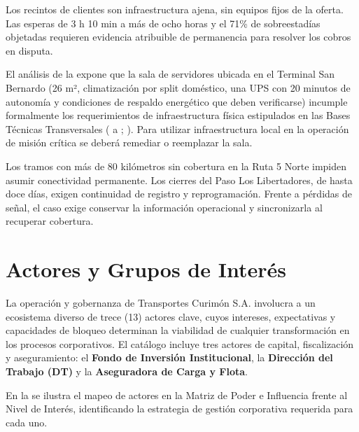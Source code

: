 Los recintos de clientes son infraestructura ajena, sin equipos fijos de la oferta. Las esperas de 3 h 10 min a más de ocho horas y el 71\% de sobreestadías objetadas requieren evidencia atribuible de permanencia para resolver los cobros en disputa.

El análisis de la  expone que la sala de servidores ubicada en el Terminal San Bernardo (26 m², climatización por split doméstico, una UPS con 20 minutos de autonomía y condiciones de respaldo energético que deben verificarse) incumple formalmente los requerimientos de infraestructura física estipulados en las Bases Técnicas Transversales ( a ; ). Para utilizar infraestructura local en la operación de misión crítica se deberá remediar o reemplazar la sala.

Los tramos con más de 80 kilómetros sin cobertura en la Ruta 5 Norte impiden asumir conectividad permanente. Los cierres del Paso Los Libertadores, de hasta doce días, exigen continuidad de registro y reprogramación. Frente a pérdidas de señal, el caso exige conservar la información operacional y sincronizarla al recuperar cobertura.

\section{Actores y Grupos de Interés}\label{sec:2-actores}

La operación y gobernanza de Transportes Curimón S.A. involucra a un ecosistema diverso de trece (13) actores clave, cuyos intereses, expectativas y capacidades de bloqueo determinan la viabilidad de cualquier transformación en los procesos corporativos. El catálogo incluye tres actores de capital, fiscalización y aseguramiento: el \textbf{Fondo de Inversión Institucional}, la \textbf{Dirección del Trabajo (DT)} y la \textbf{Aseguradora de Carga y Flota}.

En la  se ilustra el mapeo de actores en la Matriz de Poder e Influencia frente al Nivel de Interés, identificando la estrategia de gestión corporativa requerida para cada uno.


